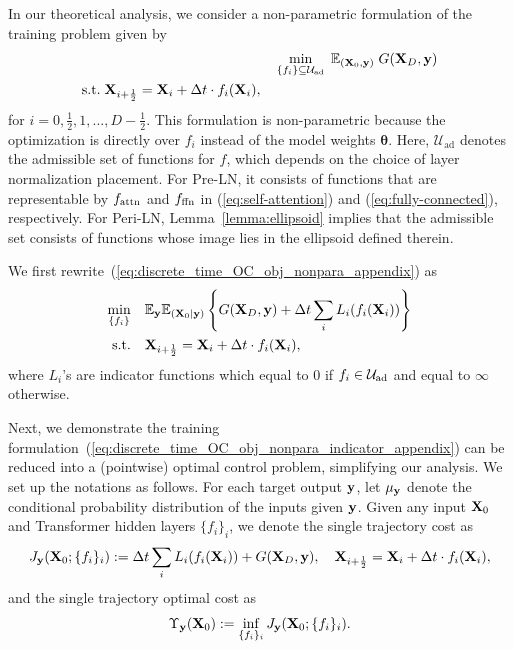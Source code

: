 \documentclass[journal]{IEEEtran}
\def\eqref#1{equation~\ref{#1}}
\newcommand{\bfX}{{\bf X}}
\newcommand{\bfy}{ {\bf y}}
\newcommand{\bftheta}{{\boldsymbol \theta}}
\renewcommand{\eqref}[1]{(\ref{#1})}
\theoremstyle{plain}
\theoremstyle{definition}
\theoremstyle{remark}
\begin{document}
In our theoretical analysis, we consider a non-parametric formulation of the training problem given by
\begin{align}\label{eq:discrete_time_OC_obj_nonpara_appendix}
    & \min_{\{f_i\} \subseteq \mathcal{U}_{\rm ad}} \; \mathbb{E}_{(\bfX_0, \bfy)} \; G(\bfX_D, \bfy) \\ 
    \begin{split} &\text{s.t.} \; \bfX_{i+\frac{1}{2}} = \bfX_i + \Delta t \cdot f_i(\bfX_{i}),
\end{split}
\end{align}
for $i=0,\frac{1}{2},1,...,D-\frac{1}{2}$. This formulation is non-parametric because the optimization is directly over $f_i$ instead of the model weights $\bftheta$. Here, $\mathcal{U}_{\text{ad}}$ denotes the admissible set of functions for $f$, which depends on the choice of layer normalization placement. For Pre-LN, it consists of functions that are representable by $f_{\rm attn}$ and $f_{\rm ffn}$ in (\ref{eq:self-attention}) and (\ref{eq:fully-connected}), respectively. For Peri-LN, Lemma~\ref{lemma:ellipsoid} implies that the admissible set consists of functions whose image lies in the ellipsoid defined therein. 

We first rewrite~\eqref{eq:discrete_time_OC_obj_nonpara_appendix}  as
\begin{align}\label{eq:discrete_time_OC_obj_nonpara_indicator_appendix}
\begin{split}
    \min_{ \{f_i\}} \quad& \mathbb{E}_{\bfy} \mathbb{E}_{(\bfX_0 | \bfy)} \left\{ G(\bfX_D, \bfy) + \Delta t \sum_{i} L_i(f_i(\bfX_i)) \right\} \\
    \text{s.t.} \quad& \bfX_{i+\frac{1}{2}}  = \bfX_i + \Delta t\cdot f_i(\bfX_{i}),
\end{split}
\end{align}
where $L_i$'s are indicator functions which equal to $0$ if $f_i \in \mathcal{U}_{\rm ad}$ and equal to $\infty$ otherwise. 

Next, we demonstrate the training formulation~\eqref{eq:discrete_time_OC_obj_nonpara_indicator_appendix} can be reduced into a (pointwise) optimal control problem, simplifying our analysis. We set up the notations as follows. For each target output $\bfy$, let $\mu_{\bfy}$ denote the conditional probability distribution of the inputs given $\bfy$. Given any input $\bfX_0$ and Transformer hidden layers $\{f_i\}_i$, we denote the single trajectory cost as
\begin{equation}
    J_\bfy(\bfX_0; \{f_i\}_i) := \Delta t \sum_{i} L_i(f_i(\bfX_i)) + G(\bfX_D, \bfy), \quad \bfX_{i+\frac{1}{2}} = \bfX_i + \Delta t \cdot f_i(\bfX_{i}),
\end{equation}
and the single trajectory optimal cost as 
\begin{equation}\label{eq:single_traj_opt_cost}
    \Upsilon_\bfy(\bfX_0):= \inf_{\{f_i\}_i} J_\bfy(\bfX_0; \{f_i\}_i).
\end{equation}
\end{document}

